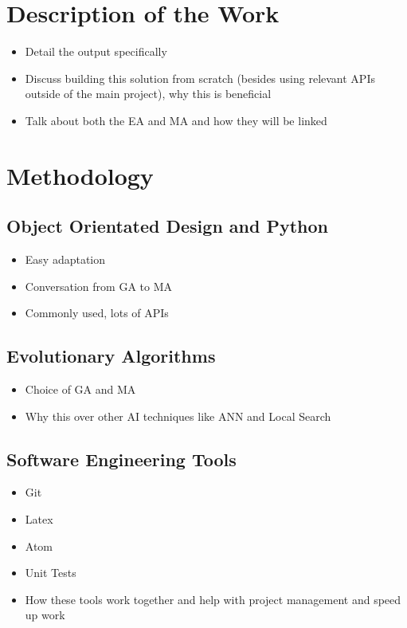 \documentclass[a4paper]{article}
\begin{document}
\section{Description of the Work}
\begin{itemize}
    \item Detail the output specifically
    \item Discuss building this solution from scratch (besides using relevant APIs outside of the main project), why this is beneficial
    \item Talk about both the EA and MA and how they will be linked
\end{itemize}

\section{Methodology}
\subsection{Object Orientated Design and Python}
\begin{itemize}
    \item Easy adaptation
    \item Conversation from GA to MA
    \item Commonly used, lots of APIs
\end{itemize}
\subsection{Evolutionary Algorithms}
\begin{itemize}
    \item Choice of GA and MA
    \item Why this over other AI techniques like ANN and Local Search
\end{itemize}
\subsection{Software Engineering Tools}
\begin{itemize}
    \item Git
    \item Latex
    \item Atom
    \item Unit Tests
    \item How these tools work together and help with project management and speed up work
\end{itemize}
\end{document}
